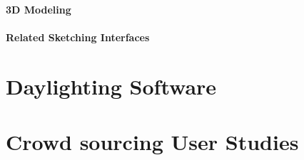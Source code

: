 		\paragraph{3D Modeling}


		\paragraph{Related Sketching Interfaces}

\section{Daylighting Software}

\section{Crowd sourcing User Studies}




